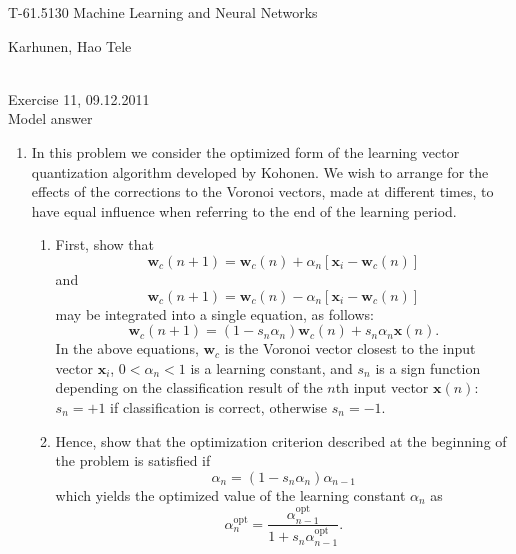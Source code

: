 \documentclass[10pt]{article}
\begin{document}
\pagestyle{empty}

\begin{Large}
\begin{bf} 
T-61.5130 Machine Learning and Neural Networks\\ 
\end{bf}
\end{Large}
Karhunen, Hao Tele\\  
\\
\begin{large}
\begin{bf}
Exercise 11, 09.12.2011\\Model answer
\end{bf}
\end{large}
\begin{enumerate}

\item In this problem we consider the optimized form of the learning
vector quantization algorithm developed by
Kohonen. We wish to arrange for the effects of the corrections to the
Voronoi vectors, made at different times, to have equal influence when
referring to the end of the learning period. \begin{enumerate}
   \item First, show that
   \begin{equation}
   \mathbf{w}_c(n+1)=\mathbf{w}_c(n)+\alpha_n[\mathbf{x}_i-\mathbf{w}_c(n)]
   \label{equation: 1}
   \end{equation}
   and
   \begin{equation}
   \mathbf{w}_c(n+1)=\mathbf{w}_c(n)-\alpha_n[\mathbf{x}_i-\mathbf{w}_c(n)]
   \label{equation: 2}
   \end{equation}
   may be integrated into a single equation, as follows:
   \begin{equation}
   \mathbf{w}_c(n+1)=(1-s_n\alpha_n)\mathbf{w}_c(n)+s_n\alpha_n\mathbf{x}(n).
   \label{equation: 3}
   \end{equation}
   In the above equations, $\mathbf{w}_c$ is the Voronoi
   vector closest to the input vector $\mathbf{x}_i$, $0<\alpha_n<1$ is a
   learning constant, and $s_n$ is a sign function depending on the
   classification result of the $n$th input vector $\mathbf{x}(n)$:
   $s_n=+1$ if classification is correct, otherwise  $s_n=-1$.

   \item Hence, show that the optimization criterion described at the
   beginning of the problem is satisfied if
   \begin{equation*}
   \alpha_n=(1-s_n\alpha_n)\alpha_{n-1}
   \end{equation*}
   which yields the optimized value of the learning constant
   $\alpha_n$ as
   \begin{equation*}
   \alpha_n^{\text{opt}}=\frac{\alpha_{n-1}^{\text{opt}}}{1+s_n\alpha_{n-1}^{\text{opt}}}.
   \end{equation*}
\end{enumerate}


\end{enumerate}
\end{document}
